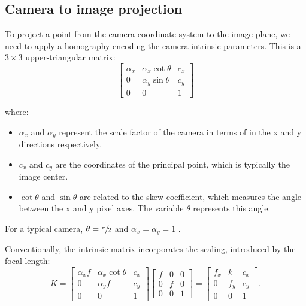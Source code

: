 \subsection{Camera to image projection}\label{sub:camera_to_image_projection}

To project a point from the camera coordinate system to the image plane, we
need to apply a homography encoding the camera intrinsic parameters.
This is a \(3 \times 3\) upper-triangular matrix:
\begin{equation}
	\begin{bmatrix}
		\alpha_x & \alpha_x \cot \theta & c_x \\
		0        & \alpha_y \sin \theta & c_y \\
		0        & 0                    & 1
	\end{bmatrix}
\end{equation}

where:
\begin{itemize}
	\item $\alpha_x$ and $\alpha_y$ represent the scale factor of the camera in
	      terms of  in the x and y directions respectively.
	\item $c_x$ and $c_y$ are the coordinates of the principal point, which is typically the image center.
	\item $\cot \theta$ and $\sin \theta$ are related to the skew coefficient, which measures the angle between the x and y pixel axes. The variable $\theta$ represents this angle.
\end{itemize}
For a typical camera, \(\theta = \sfrac{\pi}{2}\) and \(\alpha_x = \alpha_y = 1
\) \cite{hartleyMultipleViewGeometry2004}.

Conventionally, the intrinsic matrix incorporates the scaling, introduced
by the focal length:
\begin{equation}
	K = \begin{bmatrix}
		\alpha_x f & \alpha_x \cot \theta & c_x \\
		0          & \alpha_y f           & c_y \\
		0          & 0                    & 1
	\end{bmatrix} \begin{bmatrix}
		f & 0 & 0 \\
		0 & f & 0 \\
		0 & 0 & 1
	\end{bmatrix} = \begin{bmatrix}
		f_x & k   & c_x \\
		0   & f_y & c_y \\
		0   & 0   & 1
	\end{bmatrix}.
\end{equation}

